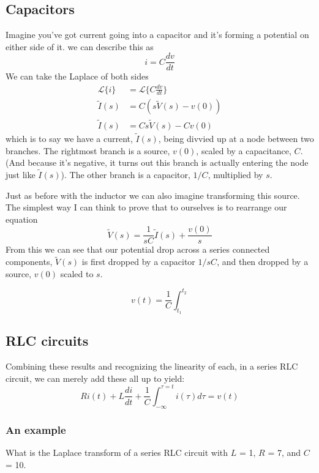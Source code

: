 \documentclass[11pt]{book}
\begin{document}
\subsection{Capacitors}

Imagine you've got current going into a capacitor and it's forming a potential on either side of it. we can describe this as 
\begin{equation}
	i = C\frac{dv}{dt}
\end{equation}
We can take the Laplace of both sides
\begin{align}
	\mathcal{L}\{i\} &= \mathcal{L}\{C\frac{dv}{dt}\} \\ 
	\tilde{I}(s) &= C(s\tilde{V}(s) - v(0)) \\
	\tilde{I}(s) &= Cs\tilde{V}(s) - Cv(0)
\end{align}
which is to say we have a current, $\tilde{I}(s)$, being divvied up at a node between two branches. The rightmost branch is a source, $v(0)$, scaled by a capacitance, $C$. (And because it's negative, it turns out this branch is actually entering the node just like $\tilde{I}(s)$). The other branch is a capacitor, $1/C$, multiplied by $s$. 

Just as before with the inductor we can also imagine transforming this source. The simplest way I can think to prove that to ourselves is to rearrange our equation
\begin{equation}
	\tilde{V}(s) = \frac{1}{sC}\tilde{I}(s) + \frac{v(0)}{s}
\end{equation}
From this we can see that our potential drop across a series connected components, $\tilde{V}(s)$ is first dropped by a capacitor $1/sC$, and then dropped by a source, $v(0)$ scaled to $s$.

\begin{equation}
	v(t) = \frac{1}{C}\int_{t_1}^{t_2}
\end{equation}

\subsection{RLC circuits}
Combining these results and recognizing the linearity of each, in a series RLC circuit, we can merely add these all up to yield:
\begin{equation}
	Ri(t) + L\frac{di}{dt} + \frac{1}{C}\int_{-\infty}^{\tau = t}i(\tau)d\tau = v(t)
\end{equation}

\subsubsection{An example}
What is the Laplace transform of a series RLC circuit with $L$ = 1, $R$ = 7, and $C$ = 10.
\end{document}
